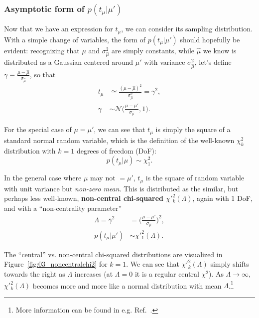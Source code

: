 \subsubsection{Asymptotic form of \texorpdfstring{$p(t_\mu|\mu')$}{p(t\_µ|µ')}}

Now that we have an expression for $t_\mu$, we can consider its sampling distribution.
With a simple change of variables, the form of $p(t_\mu|\mu')$ should hopefully be evident:
recognizing that $\mu$ and $\sigma_{\hat\mu}^2$ are simply constants, while $\hat\mu$ we know is distributed as a Gaussian centered around $\mu'$ with variance $\sigma_{\hat\mu}^2$, let's define $\gamma \equiv \frac{\mu-\hat\mu}{\sigma_{\hat\mu}}$, so that
\begin{align}
    t_\mu &\simeq \frac{(\mu-\hat\mu)^2}{\sigma_{\hat\mu}^2} = \gamma^2, \\
    \gamma &\sim \mathcal N \bigg(\frac{\mu - \mu'}{\sigma_{\hat\mu}}, 1 \bigg).
\label{eq:03_plr_gamma}
\end{align}

For the special case of $\mu = \mu'$, we can see that $t_\mu$ is simply the square of a standard normal random variable, which is the definition of the well-known $\chi^2_k$ distribution with $k=1$ degrees of freedom (DoF):
\begin{equation}
    p(t_\mu|\mu) \sim \chi^2_1.
\label{eq:03_chi2}
\end{equation}

In the general case where $\mu$ may not $ = \mu'$, $t_\mu$ is the square of random variable with unit variance but \textit{non-zero mean}.
This is distributed as the similar, but perhaps less well-known, \textbf{non-central chi-squared $\chi'^2_k(\Lambda)$}, again with 1 DoF, and with a ``non-centrality parameter'' 
\begin{align}
    \Lambda = \bar\gamma^2 &= \bigg(\frac{\mu - \mu'}{\sigma_{\hat\mu}}\bigg)^2,  
  \label{eq:03_Lambda} \\
    p(t_\mu|\mu') &\sim \chi'^2_1(\Lambda).
  \label{eq:03_noncentralchi2}
\end{align}

The ``central'' vs. non-central chi-squared distributions are visualized in Figure~\ref{fig:03_noncentralchi2} for $k = 1$.
We can see that $\chi'^2_k(\Lambda)$ simply shifts towards the right as $\Lambda$ increases (at $\Lambda = 0$ it is a regular central $\chi^2$).
As $\Lambda \rightarrow \infty$, $\chi'^2_k(\Lambda)$ becomes more and more like a normal distribution with mean $\Lambda$.\footnote{More information can be found in e.g. Ref.~\cite{enwiki:1256854724}.
}


